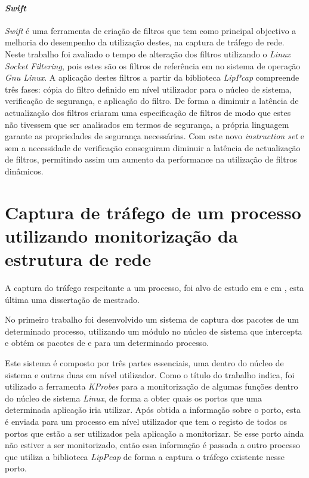 \paragraph*{\textit{Swift}}
\textit{Swift} é uma ferramenta de criação de filtros que tem como principal objectivo a melhoria do desempenho da utilização destes, na captura de tráfego de rede. Neste trabalho foi avaliado o tempo de alteração dos filtros utilizando o \textit{Linux Socket Filtering}, pois estes são os filtros de referência em no sistema de operação \textit{Gnu Linux}. A aplicação destes filtros a partir da biblioteca \textit{LipPcap} compreende três fases: cópia do filtro definido em nível utilizador para o núcleo de sistema, verificação de segurança, e aplicação do filtro. De forma a diminuir a latência de actualização dos filtros criaram uma especificação de filtros de modo que estes não tivessem que ser analisados em termos de segurança, a própria linguagem garante as propriedades de segurança necessárias. Com este novo \textit{instruction set} e sem a necessidade de verificação conseguiram diminuir a latência de actualização de filtros, permitindo assim um aumento da performance na utilização de filtros dinâmicos.

\section{Captura de tráfego de um processo utilizando monitorização da estrutura de rede}\label{sect:outras_abordagens}

A captura do tráfego respeitante a um processo, foi alvo de estudo em \cite{1688981} e em \cite{Farruca:2009}, esta última uma dissertação de mestrado. 

No primeiro trabalho foi desenvolvido um sistema de captura dos pacotes de um determinado processo, utilizando um módulo no núcleo de sistema que intercepta e obtém os pacotes de e para um determinado processo.

Este sistema é composto por três partes essenciais, uma dentro do núcleo de sistema e outras duas em nível utilizador. Como o título do trabalho indica, foi utilizado a ferramenta \textit{KProbes} para a monitorização de algumas funções dentro do núcleo de sistema \textit{Linux}, de forma a obter quais os portos que uma determinada aplicação iria utilizar. Após obtida a informação sobre o porto, esta é enviada para um processo em nível utilizador que tem o registo de todos os portos que estão a ser utilizados pela aplicação a monitorizar. Se esse porto ainda não estiver a ser monitorizado, então essa informação é passada a outro processo que utiliza a biblioteca \textit{LipPcap} de forma a captura o tráfego existente nesse porto.


